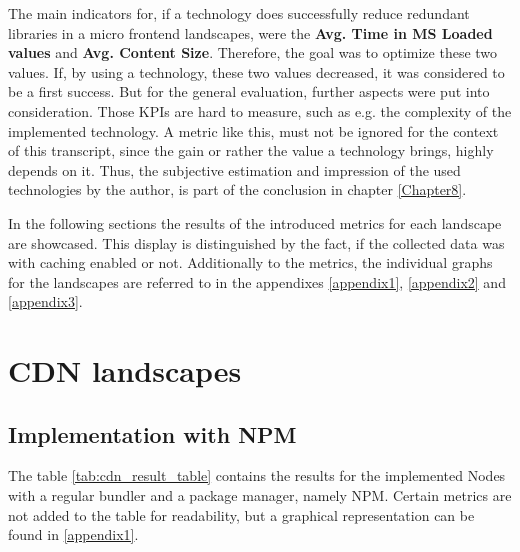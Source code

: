 The main indicators for, if a technology does successfully reduce redundant libraries in a micro frontend landscapes, were the \textbf{Avg. Time in MS Loaded values} and \textbf{Avg. Content Size}. Therefore, the goal was to optimize these two values. If, by using a technology, these two values decreased, it was considered to be a first success. But for the general evaluation, further aspects were put into consideration. Those KPIs are hard to measure, such as e.g. the complexity of the implemented technology.  
A metric like this, must not be ignored for the context of this transcript, since the gain or rather the value a technology brings, highly depends on it. Thus, the subjective estimation and impression of the used technologies by the author, is part of the conclusion in chapter \ref{Chapter8}.

In the following sections the results of the introduced metrics for each landscape are showcased. This display is distinguished by the fact, if the collected data was with caching enabled or not. Additionally to the metrics, the individual graphs for the landscapes are referred to in the appendixes \ref{appendix1}, \ref{appendix2} and \ref{appendix3}.

\section{CDN landscapes}

\subsection{Implementation with NPM}

The table \ref{tab:cdn_result_table} contains the results for the implemented Nodes with a regular bundler and a package manager, namely NPM. Certain metrics are not added to the table for readability, but a graphical representation can be found in \ref{appendix1}.

\scriptsize
\setlength{\mycolwidth}{\dimexpr \textwidth/5 - 2\tabcolsep}


